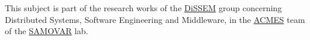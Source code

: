 \documentclass[a4paper,10pt]{article}
\begin{document}


\bigskip
\noindent{}This subject is part of the research works of the 
\href{https://www.inf.telecom-sudparis.eu/dissem/}{DiSSEM} group concerning Distributed Systems, Software Engineering and Middleware, in the \href{http://www.inf.telecom-sudparis.eu/acmes}{ACMES} team
of the \href{http://samovar.telecom-sudparis.eu/}{SAMOVAR} lab.

\newpage


\end{document}
